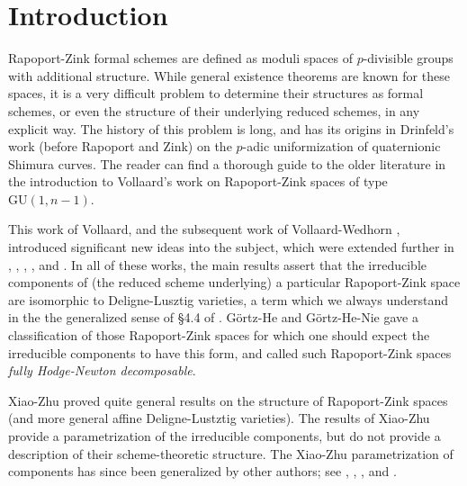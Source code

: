 \documentclass[11pt]{alggeom}
\begin{document}
\renewcommand{\thebigtheorem}{\Alph{bigtheorem}}







\section{Introduction}




Rapoport-Zink formal schemes \cite{RZbook} are  defined as moduli spaces of $p$-divisible groups with additional structure.  While general existence theorems are known for these spaces, it is a very difficult problem to determine their structures  as formal schemes, or even  the structure of their underlying reduced schemes, in any  explicit way.  
The history of this problem is long,  and has its origins in Drinfeld's work (before Rapoport and Zink) on the $p$-adic uniformization of quaternionic Shimura curves.  
The reader can find a thorough guide to the older literature in the introduction to Vollaard's work \cite{Vollaard} on Rapoport-Zink spaces of type $\mathrm{GU}(1,n-1)$.


This work of Vollaard, and the subsequent work of Vollaard-Wedhorn \cite{VollaardWedhorn}, introduced significant new ideas into the subject,  which were extended further in \cite{Fox}, \cite{HP14}, \cite{HP17}, \cite{RTW},  and \cite{Wang}.
In all of these works, the main results assert that  the irreducible components of (the reduced scheme underlying) a particular Rapoport-Zink space are isomorphic to  Deligne-Lusztig varieties, a term which we always understand in the the generalized sense of \S 4.4 of  \cite{VollaardWedhorn}.
G\"{o}rtz-He \cite{GH} and G\"{o}rtz-He-Nie \cite{GHN} gave a classification of those Rapoport-Zink spaces for which one should expect the irreducible components to have this form, and called such Rapoport-Zink spaces \emph{fully Hodge-Newton decomposable}. 

Xiao-Zhu \cite{XZ} proved quite general results on the structure of Rapoport-Zink spaces (and more general affine Deligne-Lustztig varieties).  The results of Xiao-Zhu provide a parametrization of the irreducible components,
but do not  provide a  description of their scheme-theoretic structure.
 The Xiao-Zhu  parametrization of components has since been generalized by other  authors; see   \cite{HV}, \cite{HZZ}, \cite{Nie}, and \cite{ZZ}. 
\end{document}
